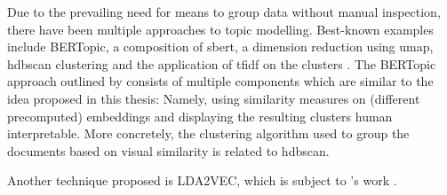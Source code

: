 
Due to the prevailing need for means to group data without manual inspection, there have been multiple approaches to topic modelling.
Best-known examples include BERTopic, a composition of \ac{sbert}, a dimension reduction using \ac{umap}, \ac{hdbscan} clustering and the application of \ac{tfidf} on the clusters \cite{bertopic2022}.
The BERTopic approach outlined by \citeauthor{bertopic2022} consists of multiple components which are similar to the idea proposed in this thesis:
Namely, using similarity measures on (different precomputed) embeddings and displaying the resulting clusters human interpretable.
More concretely, the clustering algorithm used to group the documents based on visual similarity is related to \ac{hdbscan}.

Another technique proposed is LDA2VEC, which is subject to \citeauthor{evolution_of_topic_modeling2022}'s work \cite{evolution_of_topic_modeling2022}.


